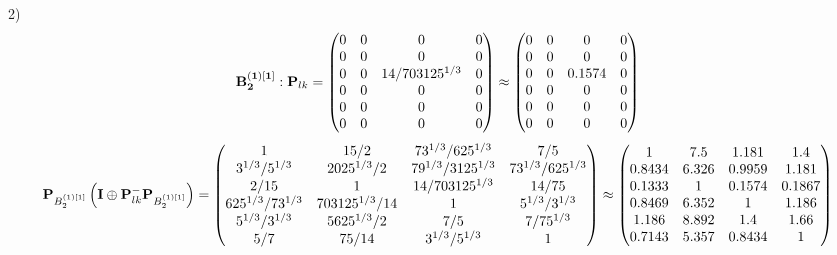 \documentclass[10pt,a4paper]{article}
\begin{document}
	2)
	\[
		\bold{B_2^{(1)[1]}}: \bold{P}_{lk} = 
		\begin{pmatrix}
			{{0}}{} & {{0}}{} & {{0}}{} & {{0}}{} \\
			{{0}}{} & {{0}}{} & {{0}}{} & {{0}}{} \\
			{{0}}{} & {{0}}{} & {{14}} / {{703125^ {1 / 3}}} & {{0}}{} \\
			{{0}}{} & {{0}}{} & {{0}}{} & {{0}}{} \\
			{{0}}{} & {{0}}{} & {{0}}{} & {{0}}{} \\
			{{0}}{} & {{0}}{} & {{0}}{} & {{0}}{} \\
		\end{pmatrix}
		\approx
		\begin{pmatrix}
			0        & 0        & 0        & 0        \\
			0        & 0        & 0        & 0        \\
			0        & 0        & 0.1574   & 0        \\
			0        & 0        & 0        & 0        \\
			0        & 0        & 0        & 0        \\
			0        & 0        & 0        & 0        \\
		\end{pmatrix}
	\]
	\[
		\bold{P}_{B_2^{(1)[1]}}\left(\bold{I} \oplus \bold{P}_{lk}^{-}\bold{P}_{B_2^{(1)[1]}}\right) = 
		\begin{pmatrix}
			{1}{} & {{15}} / {{2}} & {{7}{3^ {1 / 3}}} / {{625^ {1 / 3}}} & {{7}} / {{5}} \\
			{{3^ {1 / 3}}} / {{5^ {1 / 3}}} & {{2025^ {1 / 3}}} / {{2}} & {{7}{9^ {1 / 3}}} / {{3125^ {1 / 3}}} & {{7}{3^ {1 / 3}}} / {{625^ {1 / 3}}} \\
			{{2}} / {{15}} & {1}{} & {{14}} / {{703125^ {1 / 3}}} & {{14}} / {{75}} \\
			{{625^ {1 / 3}}} / {{7}{3^ {1 / 3}}} & {{703125^ {1 / 3}}} / {{14}} & {1}{} & {{5^ {1 / 3}}} / {{3^ {1 / 3}}} \\
			{{5^ {1 / 3}}} / {{3^ {1 / 3}}} & {{5625^ {1 / 3}}} / {{2}} & {{7}} / {{5}} & {{7}} / {{75^ {1 / 3}}} \\
			{{5}} / {{7}} & {{75}} / {{14}} & {{3^ {1 / 3}}} / {{5^ {1 / 3}}} & {1}{} \\
		\end{pmatrix}
		\approx
		\begin{pmatrix}
			1        & 7.5      & 1.181    & 1.4      \\
			0.8434   & 6.326    & 0.9959   & 1.181    \\
			0.1333   & 1        & 0.1574   & 0.1867   \\
			0.8469   & 6.352    & 1        & 1.186    \\
			1.186    & 8.892    & 1.4      & 1.66     \\
			0.7143   & 5.357    & 0.8434   & 1        \\
		\end{pmatrix}
	\]
\end{document}
